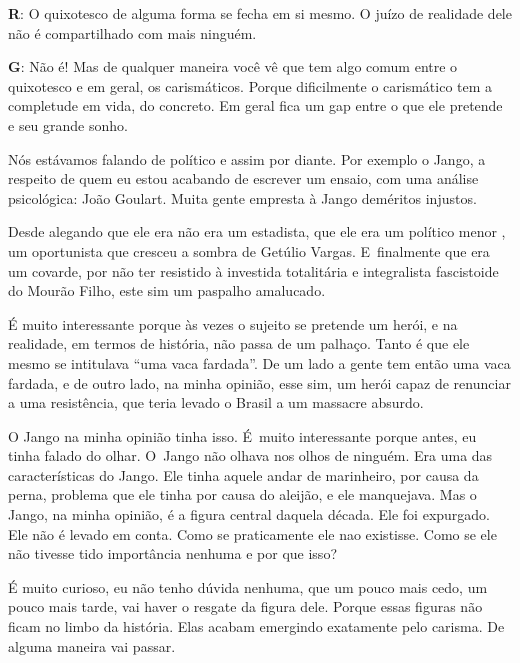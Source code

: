  

\textbf{R}: O quixotesco de alguma forma se fecha em si mesmo. O juízo de
realidade dele não é compartilhado com mais ninguém.

 

\textbf{G}: Não é! Mas de qualquer maneira você vê que tem algo comum
entre o quixotesco e em geral, os carismáticos. Porque dificilmente o
carismático tem a completude em vida, do concreto. Em geral fica um gap
entre o que ele pretende e seu grande sonho.

 

Nós estávamos falando de político e assim por diante. Por exemplo o
Jango, a respeito de quem eu estou acabando de escrever um ensaio, com
uma análise psicológica: João Goulart. Muita gente empresta à Jango
deméritos injustos.

Desde alegando que ele era não era um estadista, que ele era um político
menor , um oportunista que cresceu a sombra de Getúlio Vargas. E~finalmente que era um covarde, por não ter resistido à investida
totalitária e integralista fascistoide do Mourão Filho, este sim um
paspalho amalucado.

 

É muito interessante porque às vezes o sujeito se pretende um herói, e
na realidade, em termos de história, não passa de um palhaço. Tanto é
que ele mesmo se intitulava ``uma vaca fardada''. De um lado a gente tem
então uma vaca fardada, e de outro lado, na minha opinião, esse sim, um
herói capaz de renunciar a uma resistência, que teria levado o Brasil a
um massacre absurdo.

 

O Jango na minha opinião tinha isso. É~muito interessante porque antes,
eu tinha falado do olhar. O~Jango não olhava nos olhos de ninguém. Era
uma das características do Jango. Ele tinha aquele andar de marinheiro,
por causa da perna, problema que ele tinha por causa do aleijão, e ele
manquejava. Mas o Jango, na minha opinião, é a figura central daquela
década. Ele foi expurgado. Ele não é levado em conta. Como se
praticamente ele nao existisse. Como se ele não tivesse tido importância
nenhuma e por que isso?

 

É muito curioso, eu não tenho dúvida nenhuma, que um pouco mais cedo, um
pouco mais tarde, vai haver o resgate da figura dele. Porque essas
figuras não ficam no limbo da história. Elas acabam emergindo exatamente
pelo carisma. De alguma maneira vai passar.

 

